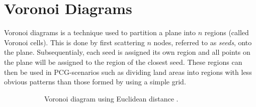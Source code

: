 \section{Voronoi Diagrams}

Voronoi diagrams is a technique used to partition a plane into $n$ regions (called Voronoi cells).
This is done by first scattering $n$ nodes, referred to as \textit{seeds}, onto the plane.
Subsequentialy, each seed is assigned its own region and all points on the plane will be assigned to the region of the closest seed.
These regions can then be used in PCG-scenarios such as dividing land areas into regions with less obvious patterns than those formed by using a simple grid.

\begin{figure}[H]
  \centering
  \begin{subfigure}[b]{0.4\textwidth}
    \caption{Voronoi diagram using Euclidean distance \cite{voronoi_euclidean}.}
    \label{fig:voronoi_euclidean}
  \end{subfigure}
  ~
  \begin{subfigure}[b]{0.4\textwidth}

\end{subfigure}
\end{figure}
